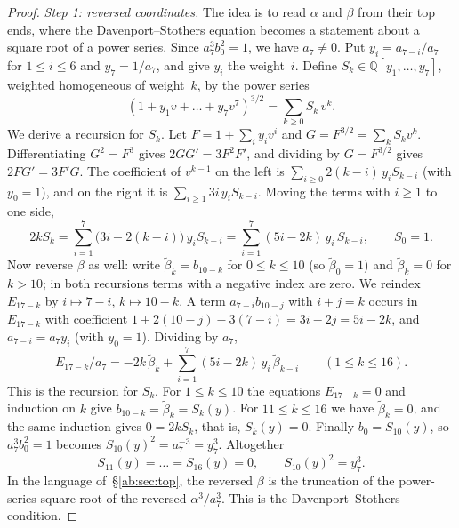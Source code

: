\documentclass[a4paper,11pt]{article}
\theoremstyle{jsplain}
\theoremstyle{jsdef}
\theoremstyle{jsrem}
\begin{document}
\begin{proof}
\emph{Step 1: reversed coordinates.} The idea is to read $\alpha$ and $\beta$ from their top ends, where the Davenport--Stothers equation becomes a statement about a square root of a power series. Since $a_7^3b_0^2=1$, we have $a_7\neq0$. Put $y_i=a_{7-i}/a_7$ for $1\le i\le 6$ and $y_7=1/a_7$, and give $y_i$ the weight~$i$. Define $S_k\in\mathbb{Q}[y_1,\dots,y_7]$, weighted homogeneous of weight~$k$, by the power series
\[
(1+y_1v+\dots+y_7v^7)^{3/2}=\sum_{k\ge0}S_k\,v^k .
\]
We derive a recursion for $S_k$. Let $F=1+\sum_iy_iv^i$ and $G=F^{3/2}=\sum_kS_kv^k$. Differentiating $G^2=F^3$ gives $2GG'=3F^2F'$, and dividing by $G=F^{3/2}$ gives $2FG'=3F'G$. The coefficient of $v^{k-1}$ on the left is $\sum_{i\ge0}2(k-i)\,y_iS_{k-i}$ (with $y_0=1$), and on the right it is $\sum_{i\ge1}3i\,y_iS_{k-i}$. Moving the terms with $i\ge1$ to one side,
\[
2kS_k=\sum_{i=1}^{7}\bigl(3i-2(k-i)\bigr)\,y_iS_{k-i}=\sum_{i=1}^{7}(5i-2k)\,y_i\,S_{k-i},\qquad S_0=1 .
\]
Now reverse $\beta$ as well: write $\tilde\beta_k=b_{10-k}$ for $0\le k\le 10$ (so $\tilde\beta_0=1$) and $\tilde\beta_k=0$ for $k>10$; in both recursions terms with a negative index are zero. We reindex $E_{17-k}$ by $i\mapsto 7-i$, $k\mapsto 10-k$. A term $a_{7-i}b_{10-j}$ with $i+j=k$ occurs in $E_{17-k}$ with coefficient $1+2(10-j)-3(7-i)=3i-2j=5i-2k$, and $a_{7-i}=a_7y_i$ (with $y_0=1$). Dividing by $a_7$,
\[
E_{17-k}/a_7=-2k\,\tilde\beta_k+\sum_{i=1}^{7}(5i-2k)\,y_i\,\tilde\beta_{k-i}\qquad(1\le k\le 16).
\]
This is the recursion for $S_k$. For $1\le k\le10$ the equations $E_{17-k}=0$ and induction on $k$ give $b_{10-k}=\tilde\beta_k=S_k(y)$. For $11\le k\le16$ we have $\tilde\beta_k=0$, and the same induction gives $0=2kS_k$, that is, $S_k(y)=0$. Finally $b_0=S_{10}(y)$, so $a_7^3b_0^2=1$ becomes $S_{10}(y)^2=a_7^{-3}=y_7^3$. Altogether
\begin{equation}\label{ab:eq:Ssystem}
S_{11}(y)=\dots=S_{16}(y)=0,\qquad S_{10}(y)^2=y_7^3 .
\end{equation}
In the language of~\S\ref{ab:sec:top}, the reversed $\beta$ is the truncation of the power-series square root of the reversed $\alpha^3/a_7^3$. This is the Davenport--Stothers condition.


\end{proof}
\end{document}
